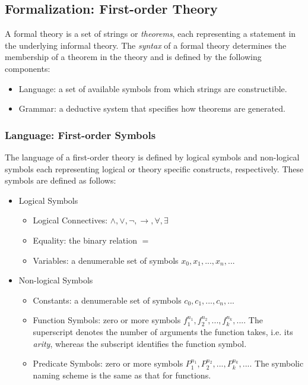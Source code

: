 \documentclass{article}
\begin{document}
\subsection{Formalization: First-order Theory}
A formal theory is a set of strings or \textit{theorems}, each representing a statement in the underlying informal theory. The \textit{syntax} of a formal theory determines the membership of a theorem in the theory and is defined by the following components:
\begin{itemize}
\item Language: a set of available symbols from which strings are constructible.
\item Grammar: a deductive system that specifies how theorems are generated.
\end{itemize} 

\subsubsection{Language: First-order Symbols}
The language of a first-order theory is defined by logical symbols and non-logical symbols each representing logical or theory specific constructs, respectively. These symbols are defined as follows:

\begin{itemize}
\item Logical Symbols
\begin{itemize}
\item Logical Connectives: $\wedge, \vee, \lnot, \to, \forall, \exists$
\item Equality: the binary relation $=$
\item Variables: a denumerable set of symbols $x_0, x_1, ..., x_n, ...$
\end{itemize}

\item Non-logical Symbols
\begin{itemize}
\item Constants: a denumerable set of symbols $c_0, c_1, ..., c_n, ...$
\item Function Symbols: zero or more symbols $f^{n_1}_1, f^{n_2}_2, ..., f^{n_k}_k, ...$. The superscript denotes the number of arguments the function takes, i.e. its \textit{arity}, whereas the subscript identifies the function symbol.
\item Predicate Symbols: zero or more symbols $P^{n_1}_1, P^{n_2}_2, ..., P^{n_k}_k, ...$. The symbolic naming scheme is the same as that for functions.
\end{itemize}

\end{itemize}
\end{document}
